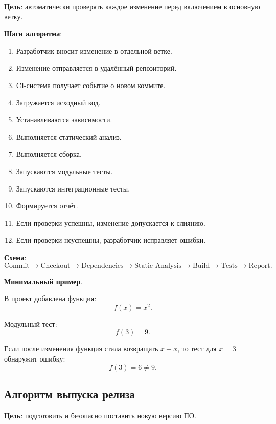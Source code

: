\documentclass[12pt,a4paper]{article}
\begin{document}
\textbf{Цель}: автоматически проверять каждое изменение перед включением в основную ветку.

\textbf{Шаги алгоритма}:
\begin{enumerate}
    \item Разработчик вносит изменение в отдельной ветке.
    \item Изменение отправляется в удалённый репозиторий.
    \item CI-система получает событие о новом коммите.
    \item Загружается исходный код.
    \item Устанавливаются зависимости.
    \item Выполняется статический анализ.
    \item Выполняется сборка.
    \item Запускаются модульные тесты.
    \item Запускаются интеграционные тесты.
    \item Формируется отчёт.
    \item Если проверки успешны, изменение допускается к слиянию.
    \item Если проверки неуспешны, разработчик исправляет ошибки.
\end{enumerate}

\textbf{Схема}:
\[
\text{Commit}
\rightarrow
\text{Checkout}
\rightarrow
\text{Dependencies}
\rightarrow
\text{Static Analysis}
\rightarrow
\text{Build}
\rightarrow
\text{Tests}
\rightarrow
\text{Report}.
\]

\textbf{Минимальный пример}.

В проект добавлена функция:
\[
f(x) = x^2.
\]

Модульный тест:
\[
f(3) = 9.
\]

Если после изменения функция стала возвращать $x + x$, то тест для $x=3$ обнаружит ошибку:
\[
f(3) = 6 \neq 9.
\]

\subsection{Алгоритм выпуска релиза}

\textbf{Цель}: подготовить и безопасно поставить новую версию ПО.
\end{document}
